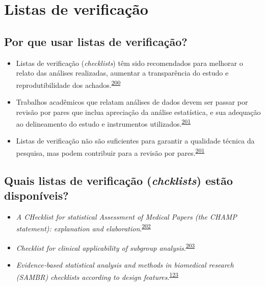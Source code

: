\documentclass[
  a4paper,
]{book}
\begin{document}
\hypertarget{checklists}{%
\section{Listas de verificação}\label{checklists}}

\hypertarget{por-que-usar-listas-de-verificauxe7uxe3o}{%
\subsection{Por que usar listas de verificação?}\label{por-que-usar-listas-de-verificauxe7uxe3o}}

\begin{itemize}
\item
  Listas de verificação (\emph{checklists}) têm sido recomendados para melhorar o relato das análises realizadas, aumentar a transparência do estudo e reprodutibilidade dos achados.\textsuperscript{\protect\hyperlink{ref-Gardner1986}{200}}
\item
  Trabalhos acadêmicos que relatam análises de dados devem ser passar por revisão por pares que inclua apreciação da análise estatística, e sua adequação ao delineamento do estudo e instrumentos utilizados.\textsuperscript{\protect\hyperlink{ref-Mascha2017}{201}}
\item
  Listas de verificação não são suficientes para garantir a qualidade técnica da pesquisa, mas podem contribuir para a revisão por pares.\textsuperscript{\protect\hyperlink{ref-Mascha2017}{201}}
\end{itemize}

\hypertarget{quais-listas-de-verificauxe7uxe3o-chcklists-estuxe3o-disponuxedveis}{%
\subsection{\texorpdfstring{Quais listas de verificação (\emph{chcklists}) estão disponíveis?}{Quais listas de verificação (chcklists) estão disponíveis?}}\label{quais-listas-de-verificauxe7uxe3o-chcklists-estuxe3o-disponuxedveis}}

\begin{itemize}
\item
  \emph{A CHecklist for statistical Assessment of Medical Papers (the CHAMP statement): explanation and elaboration}.\textsuperscript{\protect\hyperlink{ref-Mansournia2021}{202}}
\item
  \emph{Checklist for clinical applicability of subgroup analysis}.\textsuperscript{\protect\hyperlink{ref-Gil-Sierra2020}{203}}
\item
  \emph{Evidence‐based statistical analysis and methods in biomedical research (SAMBR) checklists according to design features}.\textsuperscript{\protect\hyperlink{ref-dwivedi2019}{123}}
\end{itemize}
\end{document}
